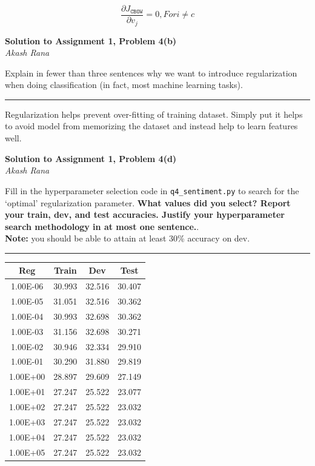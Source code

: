 \documentclass[letter,12pt]{article}
\newcommand{\myhwtitle}[3]
{\begin{center}
{\large {\bf Solution to Assignment {#1}, Problem {#2}}}\\
\medskip
{\it {#3}} %
\end{center}}
\newcommand{\solutionsAuthor}{Akash Rana}
\begin{document}
\begin{equation}
\frac {\partial {J_{\texttt{CBOW}}}} {\partial v_{j}}  =  0 , For i \neq c
\end{equation}
\clearpage

\myhwtitle{1}{4(b)}{\solutionsAuthor}
\bigskip
\noindent Explain in fewer than three sentences why we want to introduce regularization when doing classification (in fact, most machine learning tasks).\vspace{5mm}

\noindent\rule{\textwidth}{0.4pt}\vspace{5mm}
Regularization helps prevent over-fitting of training dataset. Simply put it helps to avoid model from memorizing the dataset and instead help to learn features well. 
\clearpage



\myhwtitle{1}{4(d)}{\solutionsAuthor}

\bigskip
\noindent Fill in the hyperparameter selection code in \texttt{q4\_sentiment.py} to search for the `optimal' regularization parameter. \textbf{What values did you select? Report your train, dev, and test accuracies. Justify your hyperparameter search methodology in at most one sentence.}. \\

\noindent\textbf{Note:} you should be able to attain at least 30\% accuracy on dev.\vspace{5mm}

\noindent\rule{\textwidth}{0.4pt}\vspace{5mm}

\begin{table}[!h!p]
\begin{center}
\begin{tabular}{c c c c}
\hline\hline


Reg   &  Train &  Dev & Test \\
\hline
1.00E-06 & 30.993 & 32.516 & 30.407 \\
1.00E-05 & 31.051 & 32.516  & 30.362 \\
1.00E-04 & 30.993 & 32.698  & 30.362 \\
1.00E-03 & 31.156 & 32.698  & 30.271 \\
1.00E-02 & 30.946 & 32.334  & 29.910 \\
1.00E-01 & 30.290 & 31.880  & 29.819 \\
1.00E+00 & 28.897 & 29.609  & 27.149 \\
1.00E+01 & 27.247 & 25.522  & 23.077 \\
1.00E+02 & 27.247 & 25.522  & 23.032 \\
1.00E+03 & 27.247 & 25.522  & 23.032 \\
1.00E+04 & 27.247 & 25.522  & 23.032 \\
1.00E+05 & 27.247 & 25.522  & 23.032 \\

\hline\hline
\end{tabular}
\end{center}
\end{table}
\end{document}
